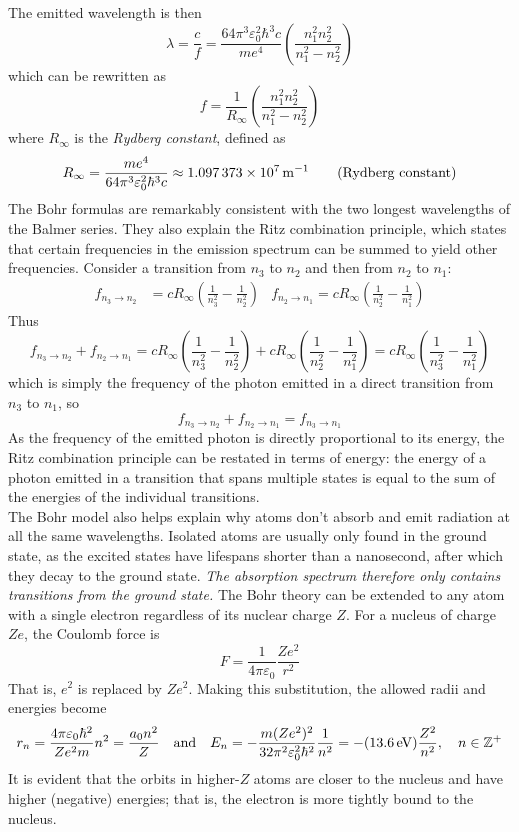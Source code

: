 \documentclass{subfiles}
\begin{document}
				The emitted wavelength is then
				\[
					\lambda = \frac{c}{f}
						= \frac{64\pi^3\varepsilon_0^2\hbar^3c}{me^4}\left(\frac{n_1^2n_2^2}{n_1^2 - n_2^2}\right)
				\]
				which can be rewritten as
				\[f = \frac{1}{R_\infty}\left(\frac{n_1^2n_2^2}{n_1^2 - n_2^2}\right)\]
				where \(R_\infty\) is the \textit{Rydberg constant}, defined as
				\[
					R_\infty = \frac{me^4}{64\pi^3\varepsilon_0^2\hbar^3c}
						\approx \SI{1.097373E7}{m^{-1}}
						\tag{Rydberg constant}
				\]
			The Bohr formulas are remarkably consistent with the two longest wavelengths of the Balmer series. They also explain the Ritz combination principle, which states that certain frequencies in the emission spectrum can be summed to yield other frequencies. Consider a transition from \(n_3\) to \(n_2\) and then from \(n_2\) to \(n_1\):
				\begin{align*}
					f_{n_3 \to n_2} &= cR_\infty\left(\frac{1}{n_3^2} - \frac{1}{n_2^2}\right) &
						f_{n_2 \to n_1} = cR_\infty\left(\frac{1}{n_2^2} - \frac{1}{n_1^2}\right)
				\end{align*}
				Thus
				\[
					f_{n_3 \to n_2} + f_{n_2 \to n_1} = cR_\infty\left(\frac{1}{n_3^2} - \frac{1}{n_2^2}\right) + cR_\infty\left(\frac{1}{n_2^2} - \frac{1}{n_1^2}\right)
						= cR_\infty\left(\frac{1}{n_3^2} - \frac{1}{n_1^2}\right)
				\]			
				which is simply the frequency of the photon emitted in a direct transition from \(n_3\) to \(n_1\), so
				\[
					f_{n_3 \to n_2} + f_{n_2 \to n_1} = f_{n_3 \to n_1}
						\tag{Ritz transition principle}
				\]
				As the frequency of the emitted photon is directly proportional to its energy, the Ritz combination principle can be restated in terms of energy: the energy of a photon emitted in a transition that spans multiple states is equal to the sum of the energies of the individual transitions. \\
			The Bohr model also helps explain why atoms don't absorb and emit radiation at all the same wavelengths. Isolated atoms are usually only found in the ground state, as the excited states have lifespans shorter than a nanosecond, after which they decay to the ground state. \textit{The absorption spectrum therefore only contains transitions from the ground state.}
			The Bohr theory can be extended to any atom with a single electron regardless of its nuclear charge \(Z\). For a nucleus of charge \(Ze\), the Coulomb force is
				\[F = \frac{1}{4\pi\varepsilon_0}\frac{Ze^2}{r^2}\]
				That is, \(e^2\) is replaced by \(Ze^2\). Making this substitution, the allowed radii and energies become
				\[
					r_n = \frac{4\pi\varepsilon_0\hbar^2}{Ze^2m}n^2
						= \frac{a_0n^2}{Z} \quad \text{and} \quad
						E_n = -\frac{m(Ze^2)^2}{32\pi^2\varepsilon_0^2\hbar^2}\frac{1}{n^2}
							= -(\SI{13.6}{eV})\frac{Z^2}{n^2}
							, \quad n \in \mathbb{Z}^+
				\]
				It is evident that the orbits in higher-\(Z\) atoms are closer to the nucleus and have higher (negative) energies; that is, the electron is more tightly bound to the nucleus.
\end{document}
